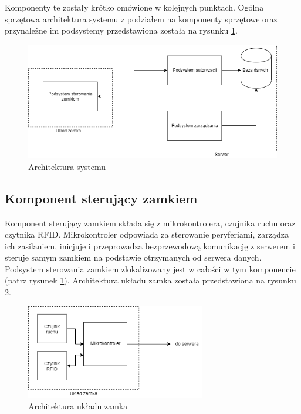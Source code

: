                 Komponenty te zostały krótko omówione w kolejnych punktach. Ogólna sprzętowa architektura systemu z podziałem na komponenty sprzętowe oraz przynależne im podsystemy przedstawiona została na rysunku \ref{fig:hl-arch}.

                \begin{figure}[]
                        \includegraphics[width=\linewidth]{chapters/images/hl-arch3.png}
                        \caption{Architektura systemu}
                        \label{fig:hl-arch}
                \end{figure}

                \subsection{Komponent sterujący zamkiem}
                        Komponent sterujący zamkiem składa się z mikrokontrolera, czujnika ruchu oraz czytnika RFID. Mikrokontroler odpowiada za sterowanie peryferiami, zarządza ich zasilaniem, inicjuje i przeprowadza bezprzewodową komunikację z serwerem i steruje samym zamkiem na podstawie otrzymanych od serwera danych. Podsystem sterowania zamkiem zlokalizowany jest w całości w tym komponencie (patrz rysunek \ref{fig:hl-arch}). Architektura układu zamka została przedstawiona na rysunku \ref{fig:lock-arch}. 

                        \begin{figure}
                                \centering
                                \includegraphics[width=0.7\textwidth]{chapters/images/lock.png}
                                \caption{Architektura układu zamka}
                                \label{fig:lock-arch}
                        \end{figure}

